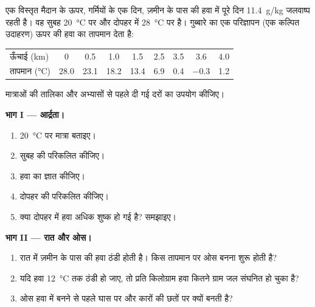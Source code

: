 \begin{problem}
\label{pb:g10:why-clouds-form:1}
एक विस्तृत मैदान के ऊपर, गर्मियों के एक दिन, ज़मीन के पास की हवा में पूरे दिन
\qty{11.4}{g/kg} जलवाष्प रहती है। वह सुबह \qty{20}{\degreeCelsius} पर
और दोपहर में \qty{28}{\degreeCelsius} पर है। गुब्बारे का एक
परिज्ञापन (एक कल्पित उदाहरण) ऊपर की हवा का तापमान देता है:

\begin{center}
\small
\begin{tabular}{l*{8}{c}}
\hline
ऊँचाई (km) & 0 & 0.5 & 1.0 & 1.5 & 2.5 & 3.5 & 3.6 & 4.0 \\
तापमान (\unit{\degreeCelsius}) & 28.0 & 23.1 & 18.2 & 13.4 & 6.9 & 0.4 & $-0.3$ & 1.2 \\
\hline
\end{tabular}
\end{center}

\noindent {} मात्राओं की तालिका और अभ्यासों से पहले दी गई दरों का
उपयोग कीजिए।

\medskip
\noindent\textbf{भाग I --- आर्द्रता।}
\begin{enumerate}
  \item \qty{20}{\degreeCelsius} पर  मात्रा बताइए।
  \item सुबह की  परिकलित कीजिए।
  \item हवा का  ज्ञात कीजिए।
  \item दोपहर की  परिकलित कीजिए।
  \item क्या दोपहर में हवा अधिक शुष्क हो गई है? समझाइए।
\end{enumerate}

\medskip
\noindent\textbf{भाग II --- रात और ओस।}
\begin{enumerate}[resume]
  \item रात में ज़मीन के पास की हवा ठंडी होती है। किस तापमान पर
        ओस बनना शुरू होती है?
  \item यदि हवा \qty{12}{\degreeCelsius} तक ठंडी हो जाए, तो प्रति किलोग्राम हवा कितने
        ग्राम जल संघनित हो चुका है?
  \item ओस हवा में बनने से पहले घास पर और कारों की छतों पर क्यों बनती
        है?
\end{enumerate}


\end{problem}
